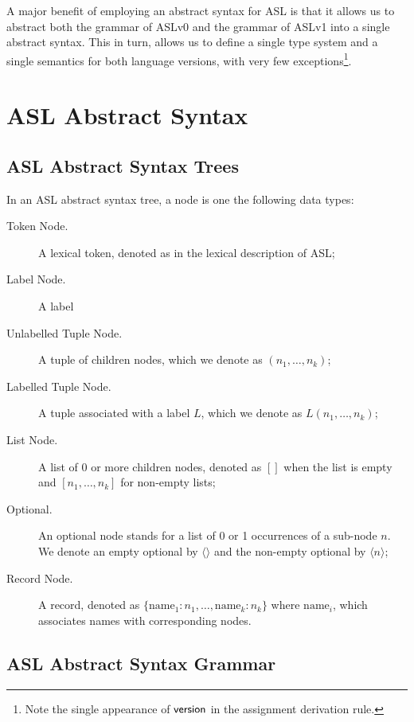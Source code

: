 \documentclass{book}
\begin{document}
A major benefit of employing an abstract syntax for ASL is that it allows us to abstract both the grammar of ASLv0 and the grammar of ASLv1 into a single abstract syntax. This in turn, allows us to define a single type system and a single semantics for both language versions, with very few exceptions\footnote{Note the single appearance of $\textsf{version}$ in the assignment derivation rule.}.

\chapter{ASL Abstract Syntax}

\section{ASL Abstract Syntax Trees}

In an ASL abstract syntax tree, a node is one the following data types:
\begin{description}
\item[Token Node.] A lexical token, denoted as in the lexical description of ASL;
\item[Label Node.] A label
\item[Unlabelled Tuple Node.] A tuple of children nodes, which we denote as $(n_1,\ldots,n_k)$;
\item[Labelled Tuple Node.] A tuple associated with a label $L$, which we denote as $L(n_1,\ldots,n_k)$;
\item[List Node.] A list of 0 or more children nodes, denoted as $[ ]$ when the list is empty and $[n_1,\ldots,n_k]$ for non-empty lists;
\item[Optional.] An optional node stands for a list of 0 or 1 occurrences of a sub-node $n$. We denote an empty optional by $\langle\rangle$ and the non-empty optional by $\langle n \rangle$;
\item[Record Node.] A record, denoted as $\{\text{name}_1 : n_1,\ldots,\text{name}_k : n_k\}$ where $\text{name}_i$, which associates names with corresponding nodes.
\end{description}

\section{ASL Abstract Syntax Grammar}
\end{document}

